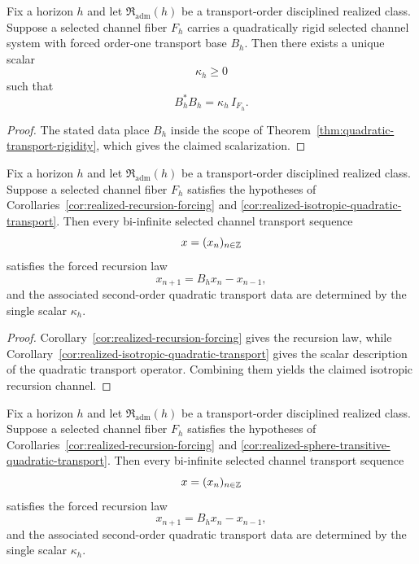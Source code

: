 \begin{corollary}
\label{cor:realized-quadratic-transport-rigidity}
Fix a horizon $h$ and let $\mathfrak R_{\mathrm{adm}}(h)$ be a transport-order
disciplined realized class. Suppose a selected channel fiber $F_h$ carries a
quadratically rigid selected channel system with forced order-one transport
base $B_h$. Then there exists a unique scalar
\[
\kappa_h\ge 0
\]
such that
\[
B_h^*B_h=\kappa_h\,I_{F_h}.
\]
\end{corollary}

\begin{proof}
The stated data place $B_h$ inside the scope of
Theorem~\ref{thm:quadratic-transport-rigidity}, which gives the claimed
scalarization.
\end{proof}

\begin{corollary}
\label{cor:realized-isotropic-recursion-channel}
Fix a horizon $h$ and let $\mathfrak R_{\mathrm{adm}}(h)$ be a transport-order
disciplined realized class. Suppose a selected channel fiber $F_h$ satisfies
the hypotheses of Corollaries~\ref{cor:realized-recursion-forcing} and
\ref{cor:realized-isotropic-quadratic-transport}. Then every bi-infinite
selected channel transport sequence
\[
x=(x_n)_{n\in\mathbb{Z}}
\]
satisfies the forced recursion law
\[
x_{n+1}=B_hx_n-x_{n-1},
\]
and the associated second-order quadratic transport data are determined by the
single scalar $\kappa_h$.
\end{corollary}

\begin{proof}
Corollary~\ref{cor:realized-recursion-forcing} gives the recursion law, while
Corollary~\ref{cor:realized-isotropic-quadratic-transport} gives the scalar
description of the quadratic transport operator. Combining them yields the
claimed isotropic recursion channel.
\end{proof}

\begin{corollary}
\label{cor:realized-sphere-transitive-recursion-channel}
Fix a horizon $h$ and let $\mathfrak R_{\mathrm{adm}}(h)$ be a transport-order
disciplined realized class. Suppose a selected channel fiber $F_h$ satisfies
the hypotheses of Corollaries~\ref{cor:realized-recursion-forcing} and
\ref{cor:realized-sphere-transitive-quadratic-transport}. Then every
bi-infinite selected channel transport sequence
\[
x=(x_n)_{n\in\mathbb{Z}}
\]
satisfies the forced recursion law
\[
x_{n+1}=B_hx_n-x_{n-1},
\]
and the associated second-order quadratic transport data are determined by the
single scalar $\kappa_h$.
\end{corollary}

